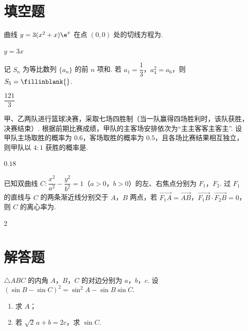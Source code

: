 \section{填空题}

\begin{problem}
曲线 \(y=3(x^2+x)\e^x\) 在点 \((0,0)\) 处的切线方程为\fillinblank{}.

\begin{answer}
\(y=3x\)
\end{answer}
\end{problem}

\begin{problem}
记 \(S_n\) 为等比数列 \(\{a_n\}\) 的前 \(n\) 项和. 若 \(a_1=\dfrac13\)，\(a_4^2=a_6\)，则 \(S_5=\fillinblank{}\).

\begin{answer}
\(\dfrac{121}{3}\)
\end{answer}
\end{problem}

\begin{problem}
甲、乙两队进行篮球决赛，采取七场四胜制（当一队赢得四场胜利时，该队获胜，决赛结束）. 根据前期比赛成绩，甲队的主客场安排依次为“主主客客主客主”. 设甲队主场取胜的概率为 \(0.6\)，客场取胜的概率为 \(0.5\)，且各场比赛结果相互独立，则甲队以 \(4:1\) 获胜的概率是\fillinblank{}.

\begin{answer}
\(0.18\)
\end{answer}
\end{problem}

\begin{problem}
已知双曲线 \(C:\dfrac{x^2}{a^2}-\dfrac{y^2}{b^2}=1\)（\(a>0\)，\(b>0\)）的左、右焦点分别为 \(F_1\)，\(F_2\). 过 \(F_1\) 的直线与 \(C\) 的两条渐近线分别交于 \(A\)，\(B\) 两点，若 \(\overrightarrow{F_1A}=\overrightarrow{AB}\)，\(\overrightarrow{F_1B}\cdot\overrightarrow{F_2B}=0\)，则 \(C\) 的离心率为\fillinblank{}.

\begin{answer}
2
\end{answer}
\end{problem}

\section{解答题}

\begin{problem}
\(\triangle ABC\) 的内角 \(A\)，\(B\)，\(C\) 的对边分别为 \(a\)，\(b\)，\(c\). 设 \((\sin B-\sin C)^2=\sin^2A-\sin B\sin C\).

\begin{enumerate}
\item 求 \(A\)；

\item 若 \(\sqrt2\,a+b=2c\)，求 \(\sin C\).
\end{enumerate}
\end{problem}

